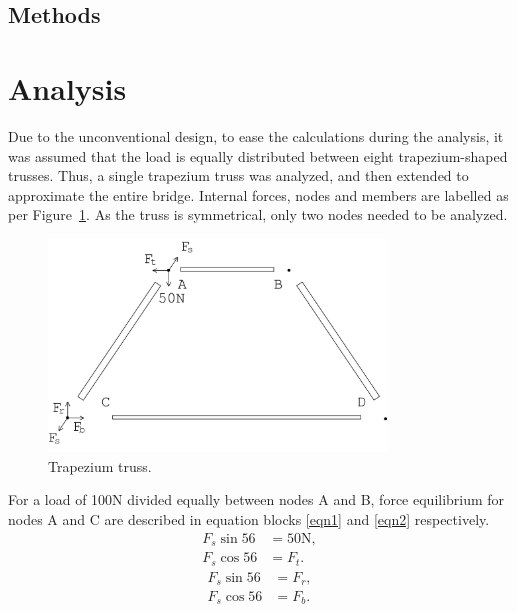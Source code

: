 \documentclass[12pt]{article}
\begin{document}
		\subsection{Methods}
	\section{Analysis}
		Due to the unconventional design, to ease the calculations during the analysis, it was assumed that the load is equally distributed between eight trapezium-shaped trusses. Thus, a single trapezium truss was analyzed, and then extended to approximate the entire bridge. Internal forces, nodes and members are labelled as per Figure~\ref{trap}. As the truss is symmetrical, only two nodes needed to be analyzed.
		\begin{figure}[h!]
			\centering
			\includegraphics[width=0.8\textwidth]{trapanal}
			\caption{Trapezium truss.}
			\label{trap}
		\end{figure}
		For a load of 100N divided equally between nodes A and B, force equilibrium for nodes A and C are described in equation blocks \ref{eqn1} and \ref{eqn2} respectively.
		\begin{subequations}
			\begin{align}
				F_s \sin 56&=50\mathrm{N}, \\
				F_s \cos 56&=F_t.
			\end{align} \label{eqn1}
		\end{subequations}
		\begin{subequations}
			\begin{align}
				F_s \sin 56&=F_r, \\ 
				F_s \cos 56&=F_b.
			\end{align} \label{eqn2}
		\end{subequations}
\end{document}
